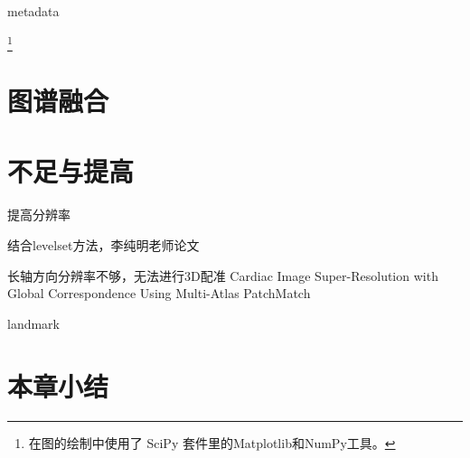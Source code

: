 metadata\par
\footnote{在图的绘制中使用了
SciPy
套件里的Matplotlib和NumPy工具。}

\section{图谱融合}

\section{不足与提高}

提高分辨率

结合levelset方法，李纯明老师论文

长轴方向分辨率不够，无法进行3D配准
Cardiac Image Super-Resolution with Global Correspondence Using Multi-Atlas PatchMatch

landmark\par
\section{本章小结}
